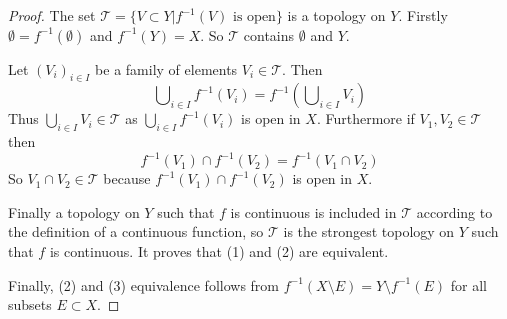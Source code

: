 \documentclass[10pt,a4paper]{amsart}
\theoremstyle{plain}
\theoremstyle{definition}
\theoremstyle{remark}
\numberwithin{equation}{subsection}
\begin{document}
\begin{proof}
The set $\mathcal{T} = \{V\subset Y | f^{-1}(V) \text{ is open}\}$ is a
topology on $Y$. Firstly $\emptyset = f^{-1}(\emptyset)$ and $f^{-1}(Y) = X$.
So $\mathcal{T}$ contains $\emptyset$ and $Y$.

\medskip\noindent
Let $(V_i)_{i \in I}$ be a family of elements $V_i \in \mathcal{T}$.
Then
$$
\bigcup\nolimits_{i\in I} f^{-1}(V_i) =
f^{-1}\left(\bigcup\nolimits_{i\in I} V_i\right)
$$
Thus $\bigcup_{i\in I} V_i \in \mathcal{T}$ as
$\bigcup_{i\in I}f^{-1}(V_i)$ is open in $X$.
Furthermore if $V_1, V_2 \in \mathcal{T}$ then
$$
f^{-1}(V_1) \cap f^{-1}(V_2) = f^{-1}(V_1 \cap V_2)
$$
So $V_1 \cap V_2 \in \mathcal{T}$ because
$f^{-1}(V_1) \cap f^{-1}(V_2)$ is open in $X$.

\medskip\noindent
Finally a topology on $Y$ such that $f$ is continuous is included in
$\mathcal{T}$ according to the definition of a continuous function, so
$\mathcal{T}$ is the strongest topology on $Y$ such that $f$ is continuous. It
proves that (1) and (2) are equivalent.

\medskip\noindent
Finally, (2) and (3) equivalence follows from $f^{-1}(X\setminus E) = Y
\setminus f^{-1}(E)$ for all subsets $E \subset X$.
\end{proof}
\end{document}
